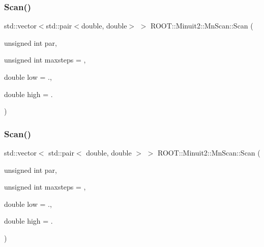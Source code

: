 \subsubsection{\texorpdfstring{Scan()}{Scan()}\hspace{0.1cm}{\footnotesize\ttfamily [1/3]}}
{\footnotesize\ttfamily std\+::vector$<$std\+::pair$<$double, double$>$ $>$ R\+O\+O\+T\+::\+Minuit2\+::\+Mn\+Scan\+::\+Scan (\begin{DoxyParamCaption}\item[{unsigned int}]{par,  }\item[{unsigned int}]{maxsteps = {},  }\item[{double}]{low = {.},  }\item[{double}]{high = {.} }\end{DoxyParamCaption})}

\mbox{\label{classROOT_1_1Minuit2_1_1MnScan_ae488bb0cc7b7127847fdccdadced3ced}} 
\subsubsection{\texorpdfstring{Scan()}{Scan()}\hspace{0.1cm}{\footnotesize\ttfamily [2/3]}}
{\footnotesize\ttfamily std\+::vector$<$ std\+::pair$<$ double, double $>$ $>$ R\+O\+O\+T\+::\+Minuit2\+::\+Mn\+Scan\+::\+Scan (\begin{DoxyParamCaption}\item[{unsigned int}]{par,  }\item[{unsigned int}]{maxsteps = {},  }\item[{double}]{low = {.},  }\item[{double}]{high = {.} }\end{DoxyParamCaption})}

